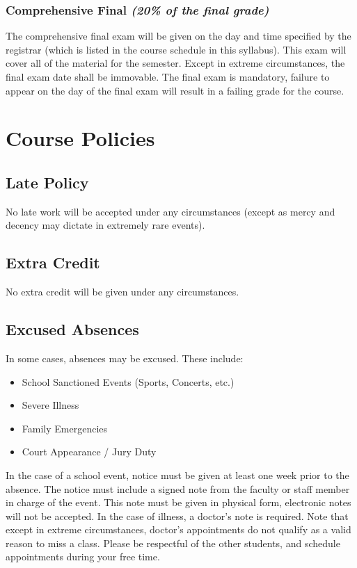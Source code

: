 \documentclass[11pt]{article}
\begin{document}
\subsubsection*{Comprehensive Final {\em (20\% of the final grade)}} 
The comprehensive
final exam will be given on the day and time specified by the
registrar (which is listed in the course schedule in this syllabus). This exam will cover all of the material for the semester.
Except in extreme circumstances, the final exam date shall be
immovable. The final exam is mandatory, failure to appear on the day of the final
exam will result in a failing grade for the course.


\newpage
\section*{Course Policies}

\subsection*{Late Policy}
No late work will be accepted under any circumstances (except as mercy
and decency may dictate in extremely rare events).

\subsection*{Extra Credit}
No extra credit will be given under any circumstances.

\subsection*{Excused Absences}
In some cases, absences may be excused. These include:
\begin{itemize}
    \item School Sanctioned Events (Sports, Concerts, etc.)
    \item Severe Illness
    \item Family Emergencies
    \item Court Appearance / Jury Duty
\end{itemize}
In the case of a school event, notice must be given at least one week
prior to the absence. The notice must include a signed note from the
faculty or staff member in charge of the event. This note must be
given in physical form, electronic notes will not be accepted.
In the case of illness, a doctor's note is required. Note that
except in extreme circumstances, doctor's appointments do not qualify as a valid reason to miss
a class. Please be respectful of the other students, and schedule
appointments during your free time.
\end{document}
